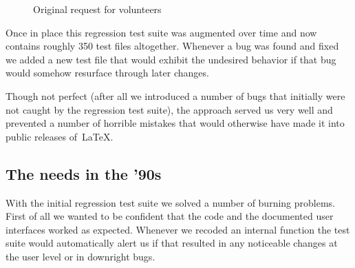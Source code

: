 \documentclass[final]{ltugboat}
\begin{document}
\begin{figure}
\centering
{}
\caption{Original request for volunteers}\label{fig:volunteers}
\end{figure}

Once in place this regression test suite was augmented over time and
now contains roughly 350 test files altogether. Whenever a bug was
found and fixed we added a new test file that would exhibit the undesired behavior
if that bug would somehow resurface through later changes. 

Though not
perfect (after all we introduced a number of bugs that initially were
not caught by the regression test suite), the approach served us very
well and prevented a number of horrible mistakes that would otherwise
have made it into public releases of~\LaTeX.

\subsection{The needs in the '90s}

With the initial regression test suite we solved a number of burning
problems. First of all we wanted to be confident that the code and the
documented user interfaces worked as expected. Whenever we recoded
an internal function the test suite would automatically alert us if that
resulted in any noticeable changes at the user level or in downright
bugs. 
\end{document}

